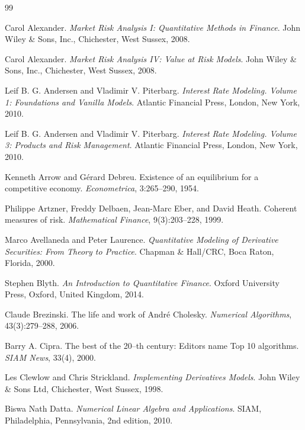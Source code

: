 \begin{thebibliography}{99}

 Carol Alexander. \textit{Market Risk Analysis I: Quantitative
Methods in Finance}. John Wiley \& Sons, Inc., Chichester, West Sussex,
2008.

 Carol Alexander. \textit{Market Risk Analysis IV: Value at Risk
Models}. John Wiley \& Sons, Inc., Chichester, West Sussex, 2008.

 Leif B. G. Andersen and Vladimir V. Piterbarg. \textit{Interest
Rate Modeling. Volume 1: Foundations and Vanilla Models}. Atlantic
Financial Press, London, New York, 2010.

 Leif B. G. Andersen and Vladimir V. Piterbarg. \textit{Interest
Rate Modeling. Volume 3: Products and Risk Management}. Atlantic Financial
Press, London, New York, 2010.

 Kenneth Arrow and Gérard Debreu. Existence of an equilibrium
for a competitive economy. \textit{Econometrica}, 3:265--290, 1954.

 Philippe Artzner, Freddy Delbaen, Jean-Marc Eber, and David
Heath. Coherent measures of risk. \textit{Mathematical Finance},
9(3):203--228, 1999.

 Marco Avellaneda and Peter Laurence. \textit{Quantitative
Modeling of Derivative Securities: From Theory to Practice}. Chapman \&
Hall/CRC, Boca Raton, Florida, 2000.

 Stephen Blyth. \textit{An Introduction to Quantitative
Finance}. Oxford University Press, Oxford, United Kingdom, 2014.

 Claude Brezinski. The life and work of André Cholesky.
\textit{Numerical Algorithms}, 43(3):279--288, 2006.

 Barry A. Cipra. The best of the 20--th century: Editors name
Top 10 algorithms. \textit{SIAM News}, 33(4), 2000.

 Les Clewlow and Chris Strickland. \textit{Implementing
Derivatives Models}. John Wiley \& Sons Ltd, Chichester, West Sussex, 1998.

 Biswa Nath Datta. \textit{Numerical Linear Algebra and
Applications}. SIAM, Philadelphia, Pennsylvania, 2nd edition, 2010.


\end{thebibliography}
